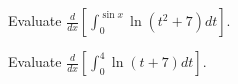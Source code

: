 \documentclass{ximera}
\author{Nela Lakos \and Kyle Parsons}
\begin{document}
\begin{exercise}

Evaluate $\frac{d}{dx}\left[\int_0^{\sin x} \ln\left(t^2+7\right) dt\right]$.
\begin{multipleChoice}
\end{multipleChoice}

Evaluate $\frac{d}{dx}\left[\int_0^4 \ln(t+7) dt\right]$.
\begin{multipleChoice}
\end{multipleChoice}

\end{exercise}
\end{document}
